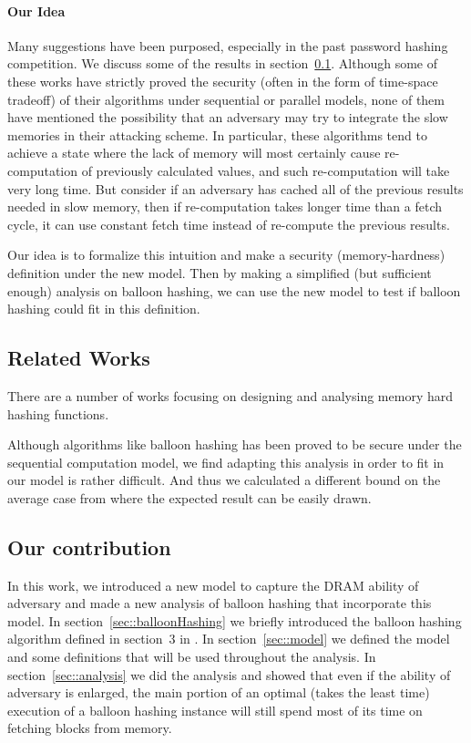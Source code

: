 \documentclass[a4paper]{article}
\begin{document}
\paragraph{Our Idea}
Many suggestions have been purposed, especially in the past password hashing competition. %
We discuss some of the results in section~\ref{subsec::relatedWorks}. Although some of these works have strictly proved
the security (often in the form of time-space tradeoff) of their algorithms under sequential or parallel models, none of
them have mentioned the possibility that
an adversary may try to integrate the slow memories in their attacking scheme. In particular, these algorithms tend to
achieve a state where the lack of memory will most certainly cause re-computation of previously calculated values, and
such re-computation will take very long time. But consider if an adversary has cached all of the previous results needed
in slow memory, then if re-computation takes longer time than a fetch cycle, it can use constant fetch time instead of
re-compute the previous results.

Our idea is to formalize this intuition and make a security (memory-hardness) definition under the new model. Then by
making a simplified (but sufficient enough) analysis on balloon hashing, we can use the new model to test if balloon
hashing could fit in this definition. %


\subsection{Related Works}\label{subsec::relatedWorks}
There are a number of works focusing on designing and analysing memory hard hashing functions.

Although algorithms like balloon hashing has been proved to be secure under the sequential computation model, we find
adapting this analysis in order to fit in our model is rather difficult. And thus we calculated a different bound on
the average case from where the expected result can be easily drawn.

\subsection{Our contribution}
In this work, we introduced a new model to capture the DRAM ability of adversary and made a new analysis of
balloon hashing that incorporate this model. In section~\ref{sec::balloonHashing} we briefly introduced the
balloon hashing algorithm defined in section~3 in \cite{corrigan2016balloon}.
In section~\ref{sec::model} we defined the model and some definitions
that will be used throughout the analysis. In section~\ref{sec::analysis} we did the analysis and showed that even
if the ability of adversary is enlarged, the main portion of an optimal (takes the least time) execution of
a balloon hashing instance will still spend most of its time on fetching blocks from memory.
\end{document}
